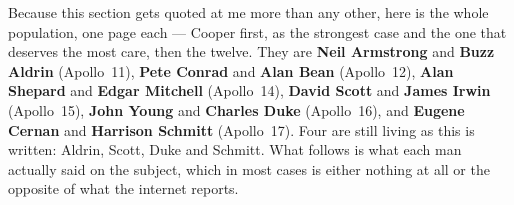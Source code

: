 Because this section gets quoted at me more than any other, here is the whole population, one page
each --- Cooper first, as the strongest case and the one that deserves the most care, then the
twelve.  They are \textbf{Neil Armstrong} and
\textbf{Buzz Aldrin} (Apollo~11), \textbf{Pete Conrad} and \textbf{Alan Bean} (Apollo~12),
\textbf{Alan Shepard} and \textbf{Edgar Mitchell} (Apollo~14), \textbf{David Scott} and
\textbf{James Irwin} (Apollo~15), \textbf{John Young} and \textbf{Charles Duke} (Apollo~16), and
\textbf{Eugene Cernan} and \textbf{Harrison Schmitt} (Apollo~17). Four are still living as this is
written: Aldrin, Scott, Duke and Schmitt. What follows is what each man actually said on the
subject, which in most cases is either nothing at all or the opposite of what the internet reports.

